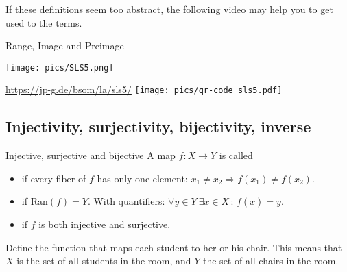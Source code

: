 If these definitions seem too abstract, the following video may help
you to get used to the terms.

\begin{Video}{Range{,} Image and Preimage}
	\begin{minipage}{0.5\linewidth}
		\begin{center}
			\texttt{[image: pics/SLS5.png]}
		\end{center}
	\end{minipage}
	\begin{minipage}{0.5\linewidth}
		\begin{center}
			\url{https://jp-g.de/bsom/la/sls5/}
			\texttt{[image: pics/qr-code\_sls5.pdf]}
		\end{center}
	\end{minipage}
\end{Video}


\subsection*{Injectivity, surjectivity, bijectivity, inverse}

\begin{Definition}{Injective{,} surjective and bijective}
A map $f: X \to Y$ is called
\begin{itemize}
 \item {} if every fiber of $f$ has only one element: $x_1 \neq x_2 \Rightarrow f(x_1) \neq f(x_2)$.
 \item {} if $\mathrm{Ran}(f)=Y$. With quantifiers: $\forall y\in Y~ \exists x\in X \,:\, f(x)=y$.
 \item {} if $f$ is both injective and surjective.
\end{itemize}
\end{Definition}


\begin{example}
Define the function that maps each student to
her or his chair. This means that $X$ is the set of all students in the room,
and $Y$ the set of all chairs in the room.
\end{example}


